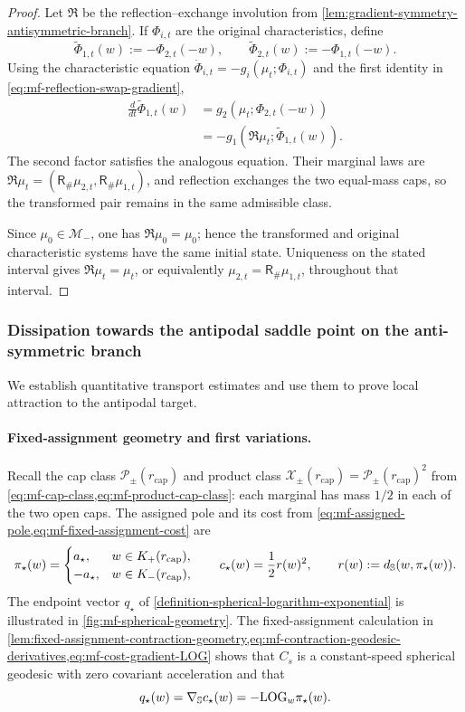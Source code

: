 \begin{proof}
Let \(\mathfrak R\) be the reflection--exchange involution from
\cref{lem:gradient-symmetry-antisymmetric-branch}.  If
\(\Phi_{i,t}\) are the original characteristics, define
\[
 \widetilde\Phi_{1,t}(w):=-\Phi_{2,t}(-w),\qquad
 \widetilde\Phi_{2,t}(w):=-\Phi_{1,t}(-w).
\]
Using the characteristic equation
\(\dot\Phi_{i,t}=-g_i(\mu_t;\Phi_{i,t})\) and the first identity in
\cref{eq:mf-reflection-swap-gradient},
\[
\begin{aligned}
 \frac d{dt}\widetilde\Phi_{1,t}(w)
 &=g_2(\mu_t;\Phi_{2,t}(-w))\\
 &=-g_1(\mathfrak R\mu_t;\widetilde\Phi_{1,t}(w)).
\end{aligned}
\]
The second factor satisfies the analogous equation.  Their marginal laws are
\(\mathfrak R\mu_t=(\mathsf R_\#\mu_{2,t},\mathsf R_\#\mu_{1,t})\), and
reflection exchanges the two equal-mass caps, so the transformed pair remains
in the same admissible class.

Since \(\mu_0\in\mathcal M_-\), one has \(\mathfrak R\mu_0=\mu_0\); hence
the transformed and original characteristic systems have the same initial
state.  Uniqueness on the stated interval gives
\(\mathfrak R\mu_t=\mu_t\), or equivalently
\(\mu_{2,t}=\mathsf R_\#\mu_{1,t}\), throughout that interval.
\end{proof}

\subsubsection{Dissipation towards the antipodal saddle point on the anti-symmetric branch}
\label{subsubsec:diddipation}

We establish quantitative transport estimates and use them to prove local attraction to the antipodal target.

\paragraph{Fixed-assignment geometry and first variations.}
Recall the cap class \(\mathcal P_\pm(r_{\mathrm{cap}})\) and product
class \(\mathcal X_\pm(r_{\mathrm{cap}})=\mathcal P_\pm(r_{\mathrm{cap}})^2\)
from \cref{eq:mf-cap-class,eq:mf-product-cap-class}: each marginal has
mass \(1/2\) in each of the two open caps. The assigned pole and its cost
from \cref{eq:mf-assigned-pole,eq:mf-fixed-assignment-cost} are
\[
 \pi_\star(w)=\begin{cases}a_\star,&w\in K_+(r_{\mathrm{cap}}),\\
                         -a_\star,&w\in K_-(r_{\mathrm{cap}}),\end{cases}
 \qquad c_\star(w)=\frac12 r(w)^2,\qquad
 r(w):=d_{\mathbb{S}}(w,\pi_\star(w)).
\]
The endpoint vector \(q_\star\) of
\cref{definition-spherical-logarithm-exponential} is illustrated in
\cref{fig:mf-spherical-geometry}.  The fixed-assignment calculation in
\cref{lem:fixed-assignment-contraction-geometry,eq:mf-contraction-geodesic-derivatives,eq:mf-cost-gradient-LOG}
shows that \(C_s\) is a constant-speed spherical geodesic with zero
covariant acceleration and that
\[
 q_\star(w)=\nabla_{\mathbb{S}} c_\star(w)=-\mathrm{LOG}_w\pi_\star(w).
\]

